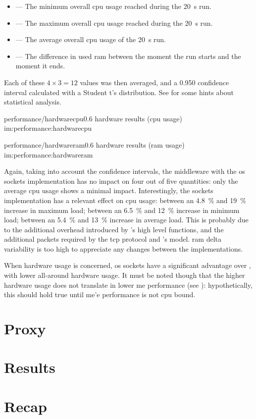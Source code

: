 \begin{itemize}
	\item {} --- The minimum overall \gls{cpu} usage reached during the \SI{20}{\second} run.
	\item {} --- The maximum overall \gls{cpu} usage reached during the \SI{20}{\second} run.
	\item {} --- The average overall \gls{cpu} usage of the \SI{20}{\second} run.
	\item {} --- The difference in used \gls{ram} between the moment the run starts and the moment it ends.
\end{itemize}

\FLOATnoindent Each of these $4\times3=12$ values was then averaged, and a \num{0,950} confidence interval calculated with a Student t's distribution. See  for some hints about statistical analysis.

\begin{image}
	{performance/hardwarecpu}{0.6}
	{hardware results (\gls{cpu} usage)}
	{im:performance:hardwarecpu}
	{}
\end{image}

\begin{image}
	{performance/hardwareram}{0.6}
	{hardware results (\gls{ram} usage)}
	{im:performance:hardwareram}
	{}
\end{image}

Again, taking into account the confidence intervals, the \gls{middleware} with the \gls{os} sockets implementation has no impact on four out of five quantities: only the average \gls{cpu} usage shows a minimal impact. Interestingly, the  sockets implementation has a relevant effect on \gls{cpu} usage: between an \SI{4,8}{\percent} and \SI{19}{\percent} increase in maximum load; between an \SI{6,5}{\percent} and \SI{12}{\percent} increase in minimum load; between an \SI{5,4}{\percent} and \SI{13}{\percent} increase in average load. This is probably due to the additional overhead introduced by 's high level functions, and the additional packets required by the \gls{tcp} protocol and 's  model. \gls{ram} delta variability is too high to appreciate any changes between the implementations.

When hardware usage is concerned, \gls{os} sockets have a significant advantage over , with lower all-around hardware usage. It must be noted though that the higher hardware usage does not translate in lower \gls{me} performance (see ): hypothetically, this should hold true until \gls{me}'e performance is not \gls{cpu} bound.

\section{Proxy}\label{sc:performance:proxy}

\section{Results}\label{sc:performance:results}

\section{Recap}\label{sc:performance:recap}
